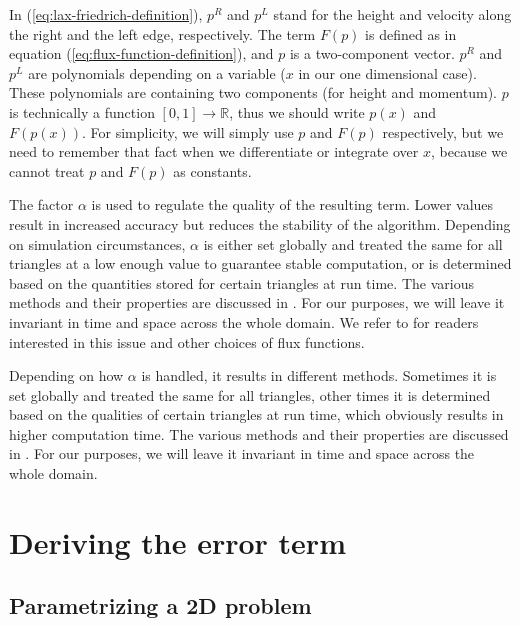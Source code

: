 \documentclass{article}
\newcommand{\reals}{\mathbb{R}}
\begin{document}
In (\ref{eq:lax-friedrich-definition}), $p^R$ and $p^L$ stand for the height and velocity along the right and the left edge, respectively. The term $F(p)$ is defined as in equation (\ref{eq:flux-function-definition}), and $p$ is a two-component vector. $p^R$ and $p^L$ are polynomials depending on a variable ($x$ in our one dimensional case). These polynomials are containing two components (for height and momentum). $p$ is technically a function $[0,1]\rightarrow\reals$, thus we should write $p\left(x\right)$ and $F\left(p\left(x\right)\right)$. For simplicity, we will simply use $p$ and $F\left(p\right)$ respectively, but we need to remember that fact when we differentiate or integrate over $x$, because we cannot treat $p$ and $F\left(p\right)$ as constants.

The factor $\alpha$ is used to regulate the quality of the resulting term.
Lower values result in increased accuracy but reduces the stability of the algorithm.
Depending on simulation circumstances, $\alpha$ is either set globally and treated the same for all triangles at a low enough value to guarantee stable computation, or is determined based on the quantities stored for certain triangles at run time.
The various methods and their properties are discussed in \cite{leveque2002finite}.
For our purposes, we will leave it invariant in time and space across the whole domain.
We refer to \cite{cockburn1999discontinuous,leveque2002finite} for readers interested in this issue and other choices of flux functions.

Depending on how $\alpha$ is handled, it results in different methods. Sometimes it is set globally and treated the same for all triangles, other times it is determined based on the qualities of certain triangles at run time, which obviously results in higher computation time. The various methods and their properties are discussed in \cite{leveque2002finite}. For our purposes, we will leave it invariant in time and space across the whole domain.

\section{Deriving the error term}
\label{sec:deriving-error-term-i}

\subsection{Parametrizing a 2D problem}
\label{sec:original-situation-2D problem}
\end{document}
